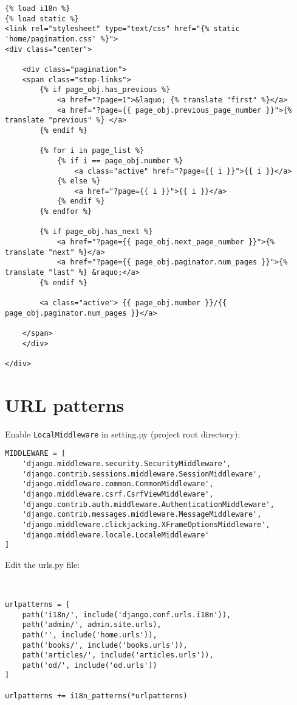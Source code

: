 \begin{lstlisting}
{% load i18n %}
{% load static %}
<link rel="stylesheet" type="text/css" href="{% static 'home/pagination.css' %}">
<div class="center">

    <div class="pagination">
    <span class="step-links">
        {% if page_obj.has_previous %}
            <a href="?page=1">&laquo; {% translate "first" %}</a>
            <a href="?page={{ page_obj.previous_page_number }}">{% translate "previous" %} </a>
        {% endif %}

        {% for i in page_list %}
            {% if i == page_obj.number %}
                <a class="active" href="?page={{ i }}">{{ i }}</a>
            {% else %}
                <a href="?page={{ i }}">{{ i }}</a>
            {% endif %}
        {% endfor %}

        {% if page_obj.has_next %}
            <a href="?page={{ page_obj.next_page_number }}">{% translate "next" %}</a>
            <a href="?page={{ page_obj.paginator.num_pages }}">{% translate "last" %} &raquo;</a>
        {% endif %}

        <a class="active"> {{ page_obj.number }}/{{ page_obj.paginator.num_pages }}</a>

    </span>
    </div>

</div>
\end{lstlisting}

\section{URL patterns}

Enable \verb|LocalMiddleware| in setting.py (project root directory):
\begin{lstlisting}
MIDDLEWARE = [
    'django.middleware.security.SecurityMiddleware',
    'django.contrib.sessions.middleware.SessionMiddleware',
    'django.middleware.common.CommonMiddleware',
    'django.middleware.csrf.CsrfViewMiddleware',
    'django.contrib.auth.middleware.AuthenticationMiddleware',
    'django.contrib.messages.middleware.MessageMiddleware',
    'django.middleware.clickjacking.XFrameOptionsMiddleware',
    'django.middleware.locale.LocaleMiddleware'
]
\end{lstlisting}


Edit the urls.py file:
\begin{lstlisting}


urlpatterns = [
    path('i18n/', include('django.conf.urls.i18n')),
    path('admin/', admin.site.urls),
    path('', include('home.urls')),
    path('books/', include('books.urls')),
    path('articles/', include('articles.urls')),
    path('od/', include('od.urls'))
]

urlpatterns += i18n_patterns(*urlpatterns)
\end{lstlisting}



